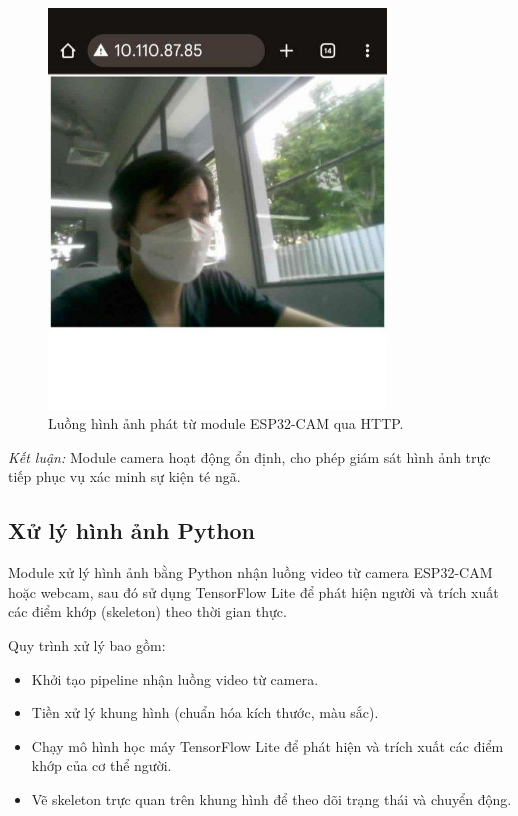 \begin{figure}[H]
    \centering
    \includegraphics[width=0.8\textwidth]{figures/module1_stream_example.jpg}
    \caption{Luồng hình ảnh phát từ module ESP32-CAM qua HTTP.}
    \label{fig:camera_stream}
\end{figure}

\textit{Kết luận:} Module camera hoạt động ổn định, cho phép giám sát hình ảnh trực tiếp phục vụ xác minh sự kiện té ngã.

\subsection{Xử lý hình ảnh Python}
Module xử lý hình ảnh bằng Python nhận luồng video từ camera ESP32-CAM hoặc webcam, sau đó sử dụng TensorFlow Lite để phát hiện người và trích xuất các điểm khớp (skeleton) theo thời gian thực.  

Quy trình xử lý bao gồm:
\begin{itemize}
    \item Khởi tạo pipeline nhận luồng video từ camera.  
    \item Tiền xử lý khung hình (chuẩn hóa kích thước, màu sắc).  
    \item Chạy mô hình học máy TensorFlow Lite để phát hiện và trích xuất các điểm khớp của cơ thể người.  
    \item Vẽ skeleton trực quan trên khung hình để theo dõi trạng thái và chuyển động.  
\end{itemize}

